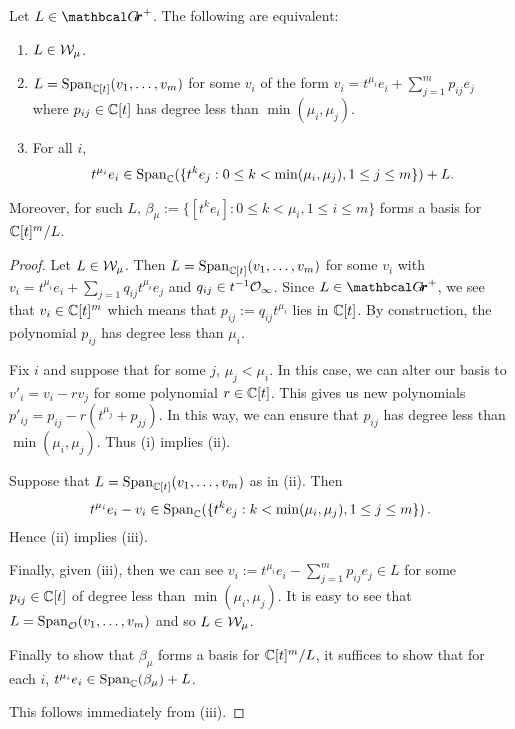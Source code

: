 \documentclass[draft]{article}
\begin{document}
\begin{lemma} \label{le:Wmu}
    Let $ L \in \Grth^+$.  The following are equivalent:
    \begin{enumerate}
        \item $ L \in \mathcal W_\mu$.
                \item $ L = \operatorname{Span}_{\mathbb C[t]}(v_1, \dots, v_m)$ for some $ v_i $ of the form $ v_i = t^{\mu_i} e_i + \sum_{j=1}^m p_{ij} e_j $ where $ p_{ij} \in \mathbb C[t] $ has degree less than $ \min(\mu_i, \mu_j)$.
        \item  For all $ i $, 
        $$ t^{\mu_i} e_i \in \operatorname{Span}_\mathbb C(\{t^k e_j : 0 \le k < \min(\mu_i, \mu_j), 1 \le j \le m \}) + L. $$
    \end{enumerate}
    Moreover, for such $L $, $ \beta_\mu := \{ [t^k e_i] : 0 \le k < \mu_i, 1 \le i \le m\}$ forms a basis for $ \mathbb C[t]^m/L$. 
\end{lemma}
% 
% 
\begin{proof}
    Let $ L \in \mathcal W_\mu$.  Then $ L = \operatorname{Span}_{\mathbb C[t]}(v_1, \dots, v_m) $ for some $ v_i $ with $ v_i = t^{\mu_i} e_i + \sum_{j=1} q_{ij}t^{\mu_i} e_j $ and $ q_{ij} \in t^{-1} \mathcal O_\infty$.  Since $ L \in \Grth^+ $, we see that $ v_i \in \mathbb C[t]^m$ which means that $ p_{ij} := q_{ij}t^{\mu_i} $ lies in $ \mathbb C[t]$.  By construction, the polynomial $ p_{ij}$ has degree less than $ \mu_i$.
    
    Fix $ i$ and suppose that for some $ j$, $ \mu_j < \mu_i$.  In this case, we can alter our basis to $ v'_i = v_i - r v_j$ for some polynomial $r \in \mathbb C[t]$.  This gives us new polynomials $ p'_{ij} = p_{ij} - r (t^{\mu_j} + p_{jj}) $.  In this way, we can ensure that $ p_{ij} $ has degree less than $ \min(\mu_i, \mu_j)$.  Thus (i) implies (ii).
    
    Suppose that $ L = \operatorname{Span}_{\mathbb C[t]}(v_1, \dots, v_m)$ as in (ii).  Then
    $$t^{\mu_i} e_i - v_i \in \operatorname{Span}_\mathbb C(\{t^k e_j :  k < \min(\mu_i, \mu_j), 1 \le j \le m \})  \,. $$
    Hence (ii) implies (iii).  

    Finally, given (iii), then we can see $ v_i := t^{\mu_i} e_i - \sum_{j=1}^m p_{ij} e_j \in L $ for some $ p_{ij} \in \mathbb C[t]$ of degree less than $ \min(\mu_i,\mu_j) $.  It is easy to see that $ L = \operatorname{Span}_\mathcal O(v_1, \dots, v_m) $ and so $ L \in \mathcal W_\mu$.  
    
    Finally to show that $ \beta_\mu$ forms a basis for $ \mathbb C[t]^m/L$, it suffices to show that for each $ i$, $ t^{\mu_i} e_i  \in \operatorname{Span}_\mathbb C(\beta_\mu) + L$. 


    This follows immediately from (iii).
\end{proof}
\end{document}
